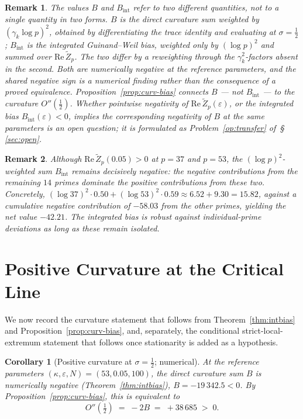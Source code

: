 \documentclass[11pt]{article}
\newtheorem{corollary}[theorem]{Corollary}
\newtheorem*{remark}{Remark}
\newcommand{\Zt}{\widetilde{Z}}
\begin{document}
\begin{remark}
The values $B$ and $B_{\mathrm{int}}$ refer to two \emph{different}
quantities, not to a single quantity in two forms.
$B$ is the direct curvature sum weighted by $(\gamma_k\log p)^2$,
obtained by differentiating the trace identity and evaluating at
$\sigma=\tfrac12$; $B_{\mathrm{int}}$ is the integrated Guinand--Weil
bias, weighted only by $(\log p)^2$ and summed over
$\mathrm{Re}\,\Zt_p$.
The two differ by a reweighting through the $\gamma_k^2$-factors
absent in the second.
Both are numerically negative at the reference parameters, and the
shared negative sign is a numerical finding rather than the consequence
of a proved equivalence.
Proposition~\ref{prop:curv-bias} connects $B$ --- not $B_{\mathrm{int}}$
--- to the curvature $O''(\tfrac12)$.
Whether pointwise negativity of $\mathrm{Re}\,\Zt_p(\varepsilon)$, or
the integrated bias $B_{\mathrm{int}}(\varepsilon)<0$, implies the
corresponding negativity of $B$ at the same parameters is an open
question; it is formulated as Problem~\ref{op:transfer} of~\S\,\ref{sec:open}.
\end{remark}

\begin{remark}
Although $\mathrm{Re}\,\Zt_p(0.05)>0$ at $p=37$ and $p=53$, the
$(\log p)^2$-weighted sum $B_{\mathrm{int}}$ remains decisively
negative: the negative contributions from the remaining $14$ primes
dominate the positive contributions from these two.
Concretely, $(\log 37)^2\cdot 0.50+(\log 53)^2\cdot 0.59\approx
6.52+9.30=15.82$, against a cumulative negative contribution of
$-58.03$ from the other primes, yielding the net value $-42.21$.
The integrated bias is robust against individual-prime deviations as
long as these remain isolated.
\end{remark}

\section{Positive Curvature at the Critical Line}
\label{sec:curvcor}

We now record the curvature statement that follows from
Theorem~\ref{thm:intbias} and Proposition~\ref{prop:curv-bias}, and,
separately, the conditional strict-local-extremum statement that
follows once stationarity is added as a hypothesis.

\begin{corollary}[Positive curvature at $\sigma=\tfrac12$; numerical]
\label{cor:curvature}
At the reference parameters $(\kappa,\varepsilon,N)=(53,0.05,100)$,
the direct curvature sum $B$ is numerically negative
(Theorem~\ref{thm:intbias}), $B=-19\,342.5<0$.
By Proposition~\ref{prop:curv-bias}, this is equivalent to
\[
O''(\tfrac12) \;=\; -2B \;=\; +38\,685 \;>\; 0.
\]
\end{corollary}
\end{document}
